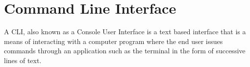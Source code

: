 \newpage
\chapter*{Command Line Interface}

A \gls{CLI}, also known as a Console User Interface is a text based interface that is a means of interacting with a computer program where the end user issues commands through an application such as the terminal in the form of successive lines of text. 